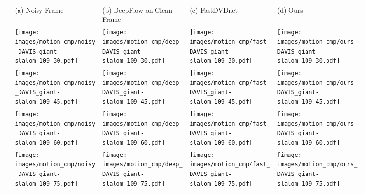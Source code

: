 \documentclass[final]{cvpr}
\begin{document}
\begin{figure*}[ht]
    \def\f1ht{\linewidth}

     \centering 
     \begin{tabular}{ >{\centering\arraybackslash}m{0.02\linewidth}
     >{\centering\arraybackslash}m{0.23\linewidth}
     >{\centering\arraybackslash}m{0.23\linewidth}
     >{\centering\arraybackslash}m{0.23\linewidth}
     >{\centering\arraybackslash}m{0.23\linewidth}
     }
     \centering
     
      &
     \footnotesize{(a) Noisy Frame} &
     \footnotesize{(b) DeepFlow on Clean Frame} &
     \footnotesize{(c) FastDVDnet} &
     \footnotesize{(d) Ours} \\
     
     30 & \texttt{[image: images/motion\_cmp/noisy\_DAVIS\_giant-slalom\_109\_30.pdf]} &
     \texttt{[image: images/motion\_cmp/deep\_DAVIS\_giant-slalom\_109\_30.pdf]} &
     \texttt{[image: images/motion\_cmp/fast\_DAVIS\_giant-slalom\_109\_30.pdf]} &
     \texttt{[image: images/motion\_cmp/ours\_DAVIS\_giant-slalom\_109\_30.pdf]} \\
     
     45 & \texttt{[image: images/motion\_cmp/noisy\_DAVIS\_giant-slalom\_109\_45.pdf]} &
     \texttt{[image: images/motion\_cmp/deep\_DAVIS\_giant-slalom\_109\_45.pdf]} &
     \texttt{[image: images/motion\_cmp/fast\_DAVIS\_giant-slalom\_109\_45.pdf]} &
     \texttt{[image: images/motion\_cmp/ours\_DAVIS\_giant-slalom\_109\_45.pdf]} \\
     
     60 & \texttt{[image: images/motion\_cmp/noisy\_DAVIS\_giant-slalom\_109\_60.pdf]} &
     \texttt{[image: images/motion\_cmp/deep\_DAVIS\_giant-slalom\_109\_60.pdf]} &
     \texttt{[image: images/motion\_cmp/fast\_DAVIS\_giant-slalom\_109\_60.pdf]} &
     \texttt{[image: images/motion\_cmp/ours\_DAVIS\_giant-slalom\_109\_60.pdf]} \\
     
     75 & \texttt{[image: images/motion\_cmp/noisy\_DAVIS\_giant-slalom\_109\_75.pdf]} &
     \texttt{[image: images/motion\_cmp/deep\_DAVIS\_giant-slalom\_109\_75.pdf]} &
     \texttt{[image: images/motion\_cmp/fast\_DAVIS\_giant-slalom\_109\_75.pdf]} &
     \texttt{[image: images/motion\_cmp/ours\_DAVIS\_giant-slalom\_109\_75.pdf]} \\
     

\end{tabular}
\end{figure*}
\end{document}
